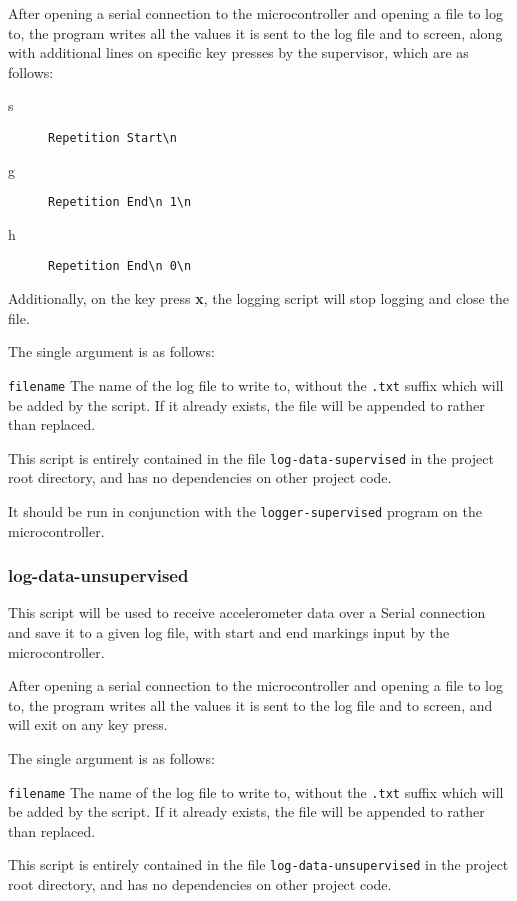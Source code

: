 \documentclass[a4paper]{article}
\begin{document}
After opening a serial connection to the microcontroller and opening a file to log to, the program writes all the values it is sent to the log file and to screen, along with additional lines on specific key presses by the supervisor, which are as follows:

\begin{description}
\item[s] \lstinline|Repetition Start\n|
\item[g] \lstinline|Repetition End\n 1\n|
\item[h] \lstinline|Repetition End\n 0\n|
\end{description}

Additionally, on the key press \textbf{x}, the logging script will stop logging and close the file.

The single argument is as follows:

\lstinline{filename} The name of the log file to write to, without the \lstinline{.txt} suffix which will be added by the script. If it already exists, the file will be appended to rather than replaced.

This script is entirely contained in the file \lstinline{log-data-supervised} in the project root directory, and has no dependencies on other project code.

It should be run in conjunction with the \lstinline{logger-supervised} program on the microcontroller.

\subsubsection{log-data-unsupervised}
\label{subsubsec:dc_csa_logunsupervised}

This script will be used to receive accelerometer data over a Serial connection and save it to a given log file, with start and end markings input by the microcontroller.

After opening a serial connection to the microcontroller and opening a file to log to, the program writes all the values it is sent to the log file and to screen, and will exit on any key press.

The single argument is as follows:

\lstinline{filename} The name of the log file to write to, without the \lstinline{.txt} suffix which will be added by the script. If it already exists, the file will be appended to rather than replaced.

This script is entirely contained in the file \lstinline{log-data-unsupervised} in the project root directory, and has no dependencies on other project code.
\end{document}
